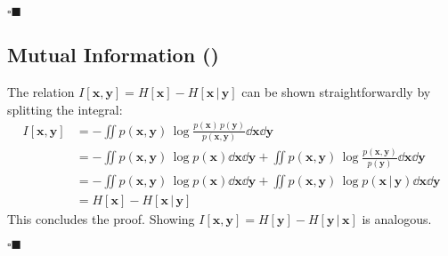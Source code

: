 \documentclass[11pt, a4paper]{scrartcl}
\renewcommand{\vec}[1]{\bm{#1}}
\newcommand{\given}{\,\vert\,}
\newcommand{\qedeot}{\hfill\(\square\blacksquare\)}
\newcommand{\diffstar}{\texorpdfstring{\raisebox{-1pt}{\resizebox{!}{8pt}{\(\star\)}}}{*}}
\newcommand{\onestar}  {(\diffstar)}
\begin{document}
			\qedeot

		\subsection{Mutual Information  \onestar}
			The relation \( I[\vec{x}, \vec{y}] = H[\vec{x}] - H[\vec{x} \given \vec{y}] \) can be shown straightforwardly by splitting the integral:
			\begin{align}
				I[\vec{x}, \vec{y}]
					&= -\!\iint\! p(\vec{x}, \vec{y}) \, \log \frac{p(\vec{x}) \, p(\vec{y})}{p(\vec{x}, \vec{y})} \dd{\vec{x}} \dd{\vec{y}} \\
					&= -\!\iint\! p(\vec{x}, \vec{y}) \, \log p(\vec{x}) \dd{\vec{x}} \dd{\vec{y}} + \iint\! p(\vec{x}, \vec{y}) \, \log \frac{p(\vec{x}, \vec{y})}{p(\vec{y})} \dd{\vec{x}} \dd{\vec{y}} \\
					&= -\!\iint\! p(\vec{x}, \vec{y}) \, \log p(\vec{x}) \dd{\vec{x}} \dd{\vec{y}} + \iint\! p(\vec{x}, \vec{y}) \, \log p(\vec{x} \given \vec{y}) \dd{\vec{x}} \dd{\vec{y}} \\
					&= H[\vec{x}] - H[\vec{x} \given \vec{y}]
			\end{align}
			This concludes the proof. Showing \( I[\vec{x}, \vec{y}] = H[\vec{y}] - H[\vec{y} \given \vec{x}] \) is analogous.

			\qedeot
\end{document}

